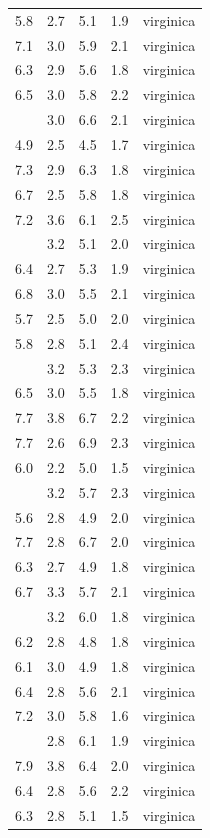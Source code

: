 \documentclass[
]{article}
\begin{document}
\begin{longtable}[t]{lllll}
5.8 & 2.7 & 5.1 & 1.9 & \vphantom{1} virginica\\
7.1 & 3.0 & 5.9 & 2.1 & virginica\\
6.3 & 2.9 & 5.6 & 1.8 & virginica\\
6.5 & 3.0 & 5.8 & 2.2 & virginica\\
\addlinespace
7.6 & 3.0 & 6.6 & 2.1 & virginica\\
4.9 & 2.5 & 4.5 & 1.7 & virginica\\
7.3 & 2.9 & 6.3 & 1.8 & virginica\\
6.7 & 2.5 & 5.8 & 1.8 & virginica\\
7.2 & 3.6 & 6.1 & 2.5 & virginica\\
\addlinespace
6.5 & 3.2 & 5.1 & 2.0 & virginica\\
6.4 & 2.7 & 5.3 & 1.9 & virginica\\
6.8 & 3.0 & 5.5 & 2.1 & virginica\\
5.7 & 2.5 & 5.0 & 2.0 & virginica\\
5.8 & 2.8 & 5.1 & 2.4 & virginica\\
\addlinespace
6.4 & 3.2 & 5.3 & 2.3 & virginica\\
6.5 & 3.0 & 5.5 & 1.8 & virginica\\
7.7 & 3.8 & 6.7 & 2.2 & virginica\\
7.7 & 2.6 & 6.9 & 2.3 & virginica\\
6.0 & 2.2 & 5.0 & 1.5 & virginica\\
\addlinespace
6.9 & 3.2 & 5.7 & 2.3 & virginica\\
5.6 & 2.8 & 4.9 & 2.0 & virginica\\
7.7 & 2.8 & 6.7 & 2.0 & virginica\\
6.3 & 2.7 & 4.9 & 1.8 & virginica\\
6.7 & 3.3 & 5.7 & 2.1 & virginica\\
\addlinespace
7.2 & 3.2 & 6.0 & 1.8 & virginica\\
6.2 & 2.8 & 4.8 & 1.8 & virginica\\
6.1 & 3.0 & 4.9 & 1.8 & virginica\\
6.4 & 2.8 & 5.6 & 2.1 & virginica\\
7.2 & 3.0 & 5.8 & 1.6 & virginica\\
\addlinespace
7.4 & 2.8 & 6.1 & 1.9 & virginica\\
7.9 & 3.8 & 6.4 & 2.0 & virginica\\
6.4 & 2.8 & 5.6 & 2.2 & virginica\\
6.3 & 2.8 & 5.1 & 1.5 & virginica\\

\end{longtable}
\end{document}
